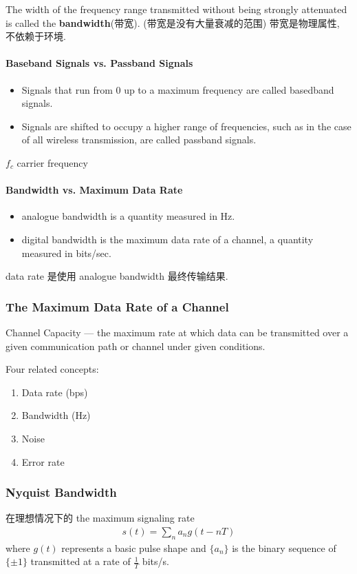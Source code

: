 The width of the frequency range transmitted without being strongly attenuated is called the \textbf{bandwidth}(带宽). (带宽是没有大量衰减的范围) 带宽是物理属性, 不依赖于环境. 

\paragraph{Baseband Signals vs. Passband Signals}\quad
\begin{itemize}
    \item Signals that run from 0 up to a maximum frequency are called basedband signals.
    \item Signals are shifted to occupy a higher range of frequencies, such as in the case of all wireless transmission, are called passband signals.
\end{itemize}

$f_c$ carrier frequency

\paragraph{Bandwidth vs. Maximum Data Rate}
\begin{itemize}
    \item analogue bandwidth is a quantity measured in Hz.
    \item digital bandwidth is the maximum data rate of a channel, a quantity measured in bits/sec.
\end{itemize}
data rate 是使用 analogue bandwidth 最终传输结果. 


\subsubsection{The Maximum Data Rate of a Channel}
Channel Capacity --- the maximum rate at which data can be transmitted over a given communication path or channel under given conditions.

Four related concepts:
\begin{enumerate}
    \item Data rate (bps)
    \item Bandwidth (Hz)
    \item Noise
    \item Error rate
\end{enumerate}

\subsubsection{Nyquist Bandwidth}
在理想情况下的 the maximum signaling rate
\begin{align*}
    s(t)=\sum_n a_n g(t-nT)
\end{align*}
where $g(t)$ represents a basic pulse shape and $\{a_n\}$ is the binary sequence of $\{\pm 1\}$ transmitted at a rate of $\frac{1}{T}$ bits/s.

